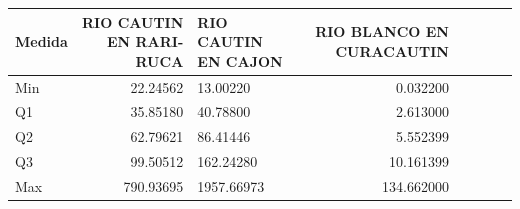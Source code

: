 
\begin{tabular}{l r|l r|l r|l r}
\hline
Medida & RIO CAUTIN EN RARI-RUCA & RIO CAUTIN EN CAJON & RIO BLANCO EN CURACAUTIN\\
\hline
Min & 22.24562 & 13.00220 & 0.032200\\
\hline
Q1 & 35.85180 & 40.78800 & 2.613000\\
\hline
Q2 & 62.79621 & 86.41446 & 5.552399\\
\hline
Q3 & 99.50512 & 162.24280 & 10.161399\\
\hline
Max & 790.93695 & 1957.66973 & 134.662000\\
\hline
\end{tabular}
